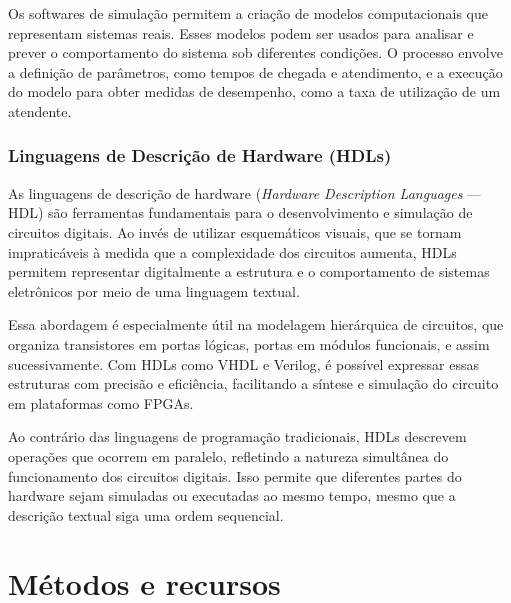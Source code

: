 \documentclass[
	12pt,				%
	openright,			%
	oneside,			%
	a4paper,			%
	english,			%
	french,				%
	spanish,			%
	brazil,				%
	]{abntex2}
\begin{document}
Os softwares de simulação permitem a criação de modelos computacionais que representam sistemas reais. Esses modelos podem ser usados para analisar e prever o comportamento do sistema sob diferentes condições. O processo envolve a definição de parâmetros, como tempos de chegada e atendimento, e a execução do modelo para obter medidas de desempenho, como a taxa de utilização de um atendente.\cite{chwif_modelagem_2014}
\subsection{Linguagens de Descrição de Hardware (HDLs)}

As linguagens de descrição de hardware (\textit{Hardware Description Languages} — HDL) são ferramentas fundamentais para o desenvolvimento e simulação de circuitos digitais. Ao invés de utilizar esquemáticos visuais, que se tornam impraticáveis à medida que a complexidade dos circuitos aumenta, HDLs permitem representar digitalmente a estrutura e o comportamento de sistemas eletrônicos por meio de uma linguagem textual.\cite{keim_what_2020}

Essa abordagem é especialmente útil na modelagem hierárquica de circuitos, que organiza transistores em portas lógicas, portas em módulos funcionais, e assim sucessivamente. Com HDLs como VHDL e Verilog, é possível expressar essas estruturas com precisão e eficiência, facilitando a síntese e simulação do circuito em plataformas como FPGAs.

Ao contrário das linguagens de programação tradicionais, HDLs descrevem operações que ocorrem em paralelo, refletindo a natureza simultânea do funcionamento dos circuitos digitais. Isso permite que diferentes partes do hardware sejam simuladas ou executadas ao mesmo tempo, mesmo que a descrição textual siga uma ordem sequencial.\cite{keim_what_2020}

\chapter{Métodos e recursos}\label{metodos_e_recursos}
\end{document}
